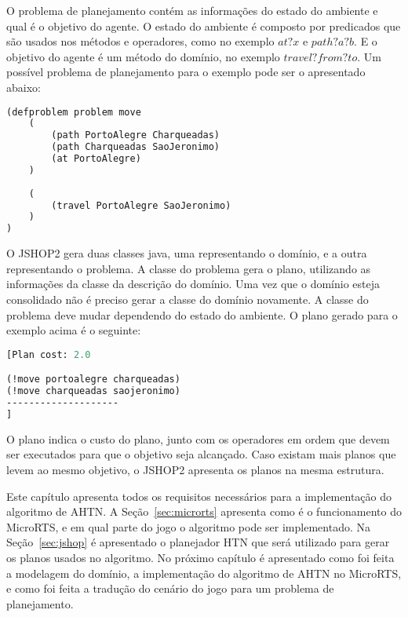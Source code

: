 O problema de planejamento contém as informações do estado do ambiente e qual é o objetivo do agente. 
O estado do ambiente é composto por predicados que são usados nos métodos e operadores, como no exemplo $at ?x$ e $path ?a ?b$. E o objetivo do agente é um método do domínio, no exemplo $travel ?from ?to$. Um possível problema de planejamento para o exemplo pode ser o apresentado abaixo:


\begin{lstlisting}[language=lisp]
(defproblem problem move
	( 
		(path PortoAlegre Charqueadas)
		(path Charqueadas SaoJeronimo)
		(at PortoAlegre)
	)
	
	(
		(travel PortoAlegre SaoJeronimo)
	)
)
\end{lstlisting}

O JSHOP2 gera duas classes java, uma representando o domínio, e a outra representando o problema.
A classe do problema gera o plano, utilizando as informações da classe da descrição do domínio.
Uma vez que o domínio esteja consolidado não é preciso gerar a classe do domínio novamente. A classe do problema deve mudar dependendo do estado do ambiente.  
O plano gerado para o exemplo acima é o seguinte:

\begin{lstlisting}[language=lisp]
[Plan cost: 2.0

(!move portoalegre charqueadas)
(!move charqueadas saojeronimo)
--------------------
]
\end{lstlisting}

O plano indica o custo do plano, junto com os operadores em ordem que devem ser executados para que o objetivo seja alcançado. 
Caso existam mais planos que levem ao mesmo objetivo, o JSHOP2 apresenta os planos na mesma estrutura.

Este capítulo apresenta todos os requisitos necessários para a implementação do algoritmo de AHTN.
A Seção~\ref{sec:microrts} apresenta como é o funcionamento do MicroRTS, e em qual parte do jogo o algoritmo pode ser implementado.
Na Seção~\ref{sec:jshop} é apresentado o planejador HTN que será utilizado para gerar os planos usados no algoritmo. 
No próximo capítulo é apresentado como foi feita a modelagem do domínio, a implementação do algoritmo de AHTN no MicroRTS, e como foi feita a tradução do cenário do jogo para um problema de planejamento.

